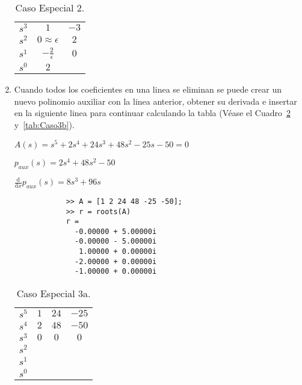 \begin{enumerate}
            \begin{table}[htbp]
                \centering
                \begin{tabular}{c|c c}
                $s^3$ & $1$ & $-3$ \\
                $s^2$ & $0\approx\epsilon$ & $2$ \\
                $s^1$ & $-\frac{2}{\epsilon}$ & $0$ \\
                $s^0$ & $2$
                \end{tabular}
                \caption{\label{tab:Caso2}Caso Especial 2.}
            \end{table}

            \item Cuando todos los coeficientes en una linea se eliminan se puede crear un nuevo polinomio auxiliar con la linea anterior, obtener su derivada e insertar en la siguiente linea para continuar calculando la tabla (Véase el Cuadro~\ref{tab:Caso3a} y~\ref{tab:Caso3b}).

            \begin{math}
            A(s) = s^5 + 2 s^4 + 24 s^3 + 48 s^2 - 25 s - 50 = 0
            \end{math}

            \begin{math}
            p_{aux}(s) = 2 s^4 + 48 s^2 - 50
            \end{math}

            \begin{math}
            \frac{\mathrm d}{\mathrm d x} p_{aux}(s) = 8 s^3 + 96 s
            \end{math}

            \begin{verbatim}
            >> A = [1 2 24 48 -25 -50];
            >> r = roots(A)
            r =
              -0.00000 + 5.00000i
              -0.00000 - 5.00000i
               1.00000 + 0.00000i
              -2.00000 + 0.00000i
              -1.00000 + 0.00000i
            \end{verbatim}

            \begin{table}[htbp]
                \centering
                \begin{tabular}{c|c c c}
                $s^5$ & $1$ & $24$ & $-25$ \\
                $s^4$ & $2$ & $48$ & $-50$ \\
                $s^3$ & $0$ & $0$  & $0$   \\
                $s^2$ \\
                $s^1$ \\
                $s^0$
                \end{tabular}
                \caption{\label{tab:Caso3a}Caso Especial 3a.}
            \end{table}


\end{enumerate}
